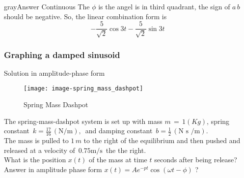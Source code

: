 \begin{mybox}{gray}{Answer Continuous}
    The $\phi$ is the angel is in third quadrant, the sign of $a \, b\,$ should be negative.
  So, the linear combination form is
  \begin{equation*}
    -\frac{5}{\sqrt{2}} \cos 3t  -\frac{5}{\sqrt{2}} \sin 3t 
  \end{equation*}
\end{mybox}
\clearpage

\subsubsection{Graphing a damped sinusoid}

\begin{problem}
  Solution in amplitude-phase form
\end{problem}

\begin{figure}[ht!]
  \centering
  \texttt{[image: image-spring\_mass\_dashpot]}
  \caption{Spring Mass Dashpot}
\end{figure}

The spring-mass-dashpot system is set up with mass $m \, = \, 1(Kg)$,
spring constant $\, \displaystyle k= \frac{17}{16} \, (\text {N/m}),\,$
and damping constant $\, \displaystyle b=\frac{1}{2}\, (\text {N s /m})$. \\

The mass is pulled to $1\, m$ to the right of the equilibrium and then pushed
and released at a velocity of $\, 0.75\text {m/s}\,$ the the right. \\

What is the position $x(t)$ of the mass at time $t$ seconds after being release?
Answer in amplitude phase form $x(t) = Ae^{-pt}\cos (\omega t- \phi )$ ?


